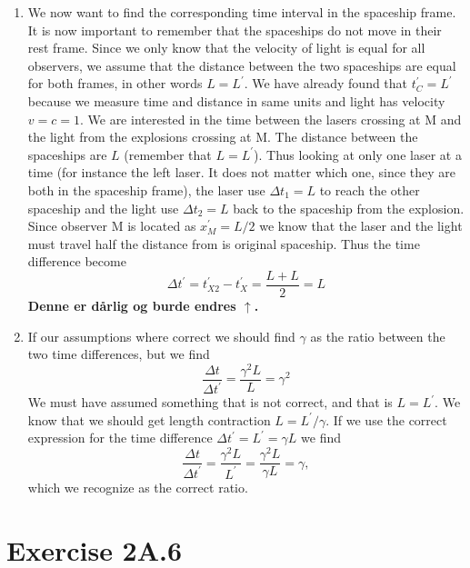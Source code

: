 \documentclass[a4paper,10pt,english]{article}
\begin{document}
\begin{enumerate}
\item We now want to find the corresponding time interval in the spaceship frame. It is now important to remember that the spaceships do not move in their rest frame. Since we only know that the velocity of light is equal for all observers, we assume that the distance between the two spaceships are equal for both frames, in other words $L=L^{\prime}$. We have already found that $t_{C}^{\prime}=L^{\prime}$ because we measure time and distance in same units and light has velocity $v=c=1$. We are interested in the time between the lasers crossing at M and the light from the explosions crossing at M. The distance between the spaceships are $L$ (remember that $L=L^{\prime}$). Thus looking at only one laser at a time (for instance the left laser. It does not matter which one, since they are both  in the spaceship frame), the laser use $\Delta t_{1}=L$ to reach the other spaceship and the light use $\Delta t_{2}=L$ back to the spaceship from the explosion. Since observer M is located as $x_{M}^{\prime}=L/2$ we know that the laser and the light must travel half the distance from is original spaceship. Thus the time difference become
\[\Delta t^{\prime}=t_{X2}^{\prime}-t_{X}^{\prime}=\frac{L+L}{2}=L\]
\textbf{Denne er dårlig og burde endres $\uparrow$.}

\item If our assumptions where correct we should find $\gamma$ as the ratio between the two time differences, but we find
\[\frac{\Delta t}{\Delta t^{\prime}}=\frac{\gamma^{2}L}{L}=\gamma^{2}\]
We must have assumed something that is not correct, and that is $L=L^{\prime}$. We know that we should get length contraction $L=L^{\prime}/\gamma$. If we use the correct expression for the time difference $\Delta t^{\prime}=L^{\prime}=\gamma L$ we find
\[\frac{\Delta t}{\Delta t^{\prime}}=\frac{\gamma^{2}L}{L^{\prime}}=\frac{\gamma^{2}L}{\gamma L}=\gamma,\]
which we recognize as the correct ratio.

\end{enumerate}








\section*{Exercise 2A.6}
\end{document}

